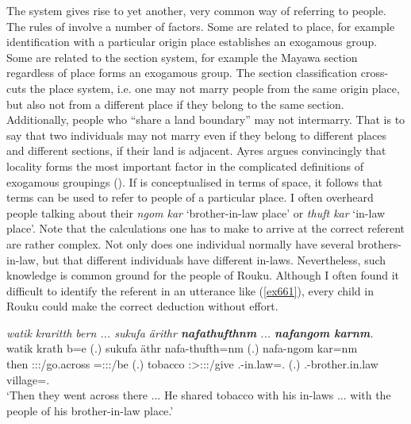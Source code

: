 The  system gives rise to yet another, very common way of referring to people. The rules of  involve a number of factors. Some are related to place, for example identification with a particular origin place establishes an exogamous group. Some are related to the section system, for example the Mayawa section regardless of place forms an exogamous group. The section classification cross-cuts the place system, i.e. one may not marry people from the same origin place, but also not from a different place if they belong to the same section. Additionally, people who ``share a land boundary'' may not intermarry. That is to say that two individuals may not marry even if they belong to different places and different sections, if their land is adjacent. Ayres argues convincingly that locality forms the most important factor in the complicated definitions of exogamous groupings (\citeyear[{\S}5]{Ayres:ws}). If  is conceptualised in terms of space, it follows that  terms can be used to refer to people of a particular place. I often overheard people talking about their \emph{ngom kar} `brother-in-law place' or \emph{thuft kar} `in-law place'. Note that the calculations one has to make to arrive at the correct referent are rather complex. Not only does one individual normally have several brothers-in-law, but that different individuals have different in-laws. Nevertheless, such knowledge is common ground for the people of Rouku. Although I often found it difficult to identify the referent in an utterance like (\ref{ex661}), every child in Rouku could make the correct deduction without effort.

\begin{exe}
	\ex \emph{watik kraritth bern ... sukufa ärithr \textbf{nafathufthnm} ... \textbf{nafangom karnm}.}\\
	\gll watik krath b=e (.) sukufa äthr nafa-thufth=nm (.) nafa-ngom kar=nm\\
	then \Stdu:\Sbj:\Irr:\Pfv/go.across \Med=\Stdu:\Sbj:\Nonpast:\Ipfv/be (.) tobacco \Stsg:\Sbj>\Stpl:\Io:\Nonpast:\Ipfv/give \Third.\Poss-{in.law}=\Dat.{\Nsg} (.) \Third.\Poss-{brother.in.law} village=\Dat.{\Nsg}\\
	\trans `Then they went across there ... He shared tobacco with his in-laws ... with the people of his brother-in-law place.'
	\label{ex661}
\end{exe}

